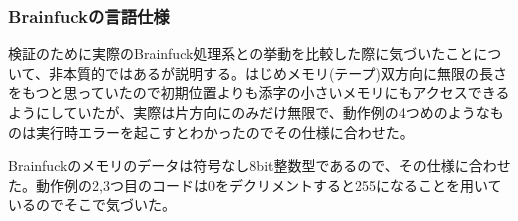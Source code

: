 \documentclass[11pt,a4paper]{jsarticle}
\begin{document}
\subsubsection*{Brainfuckの言語仕様}
検証のために実際のBrainfuck処理系との挙動を比較した際に気づいたことについて、非本質的ではあるが説明する。はじめメモリ(テープ)双方向に無限の長さをもつと思っていたので初期位置よりも添字の小さいメモリにもアクセスできるようにしていたが、実際は片方向にのみだけ無限で、動作例の4つめのようなものは実行時エラーを起こすとわかったのでその仕様に合わせた。\par
Brainfuckのメモリのデータは符号なし8bit整数型であるので、その仕様に合わせた。動作例の2,3つ目のコードは0をデクリメントすると255になることを用いているのでそこで気づいた。
\end{document}
